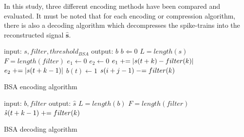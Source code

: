 In this study, three different encoding methods have been compared and evaluated. It must be noted that for each encoding or compression algorithm, there is also a decoding algorithm which decompresses the spike-trains into the reconstructed signal $\mathbf{\hat{s}}$.   
\begin{algorithm}
	\begin{algorithmic}[1]
		\STATE input: $s, filter, threshold_{BSA}$
		\STATE output: $b$
		\STATE $b\Leftarrow 0$
		\STATE $L=length(s)$
		\STATE $F=length(filter)$
			\STATE $e_1\leftarrow 0$
			\STATE $e_2\leftarrow 0$
			    \STATE $e_1 \mathrel{+}= |s(t+k)-filter(k)|$
			    \STATE $e_2 \mathrel{+}= |s(t+k-1)|$      
			\ENDFOR
			    \STATE $b(t)\leftarrow 1$
			        \STATE $s(i+j-1)\mathrel{-}= filter(k)$
			    \ENDFOR
			\ENDIF
		\ENDFOR
		\caption{BSA encoding algorithm}
		\label{alg:bsa-enc}
	\end{algorithmic}
\end{algorithm}

\begin{algorithm}
	\begin{algorithmic}[1]
		\STATE input: $b, filter$
		\STATE output: $\hat{s}$
		\STATE $L=length(b)$
		\STATE $F=length(filter)$
		            \STATE $\hat{s}(t+k-1)\mathrel{+}= filter(k)$
		        \ENDFOR
		    \ENDIF
		\ENDFOR
		\caption{BSA decoding algorithm}
		\label{alg:bsa-dec}
	\end{algorithmic}
\end{algorithm}


